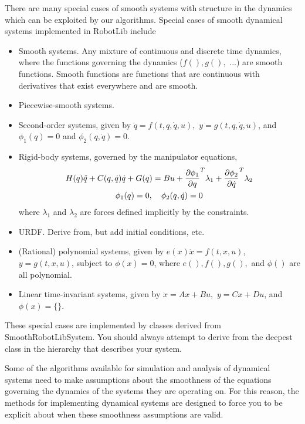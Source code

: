 There are many special cases of smooth systems with structure in the
dynamics which can be exploited by our algorithms.  Special cases of
smooth dynamical systems implemented in RobotLib include
\begin{itemize}
\item Smooth systems.  Any mixture of continuous and discrete time dynamics, where the functions governing the dynamics ($f(), g(),$ ...) are smooth functions.  Smooth functions are functions that are continuous with derivatives that exist everywhere  and are smooth\cite{wiki:Smooth_Function}.   
\item Piecewise-smooth systems. 
\item Second-order systems, given by $\ddot{q} = f(t,q,\dot{q},u),$ $y
  = g(t,q,\dot{q},u)$, and $\phi_1(q)=0$ and $\phi_2(q,\dot{q})=0$.  
\item Rigid-body systems, governed by the manipulator
  equations, \begin{gather*}H(q)\ddot{q} + C(q,\dot{q})\dot{q} + G(q) = Bu + \frac{\partial \phi_1}{\partial q}^T
  \lambda_1 + \frac{\partial \phi_2}{\partial \dot{q}}^T \lambda_2\\ \phi_1(q) = 0, \quad
  \phi_2(q,\dot{q})=0\end{gather*} where $\lambda_1$ and $\lambda_2$
are forces defined implicitly by the constraints.   
\item URDF.  Derive from, but add initial conditions, etc.
\item (Rational) polynomial systems, given by $e(x)\dot{x} =
  f(t,x,u)$, $y = g(t,x,u)$, subject to $\phi(x)=0$, where $e(), f(),
  g(),$ and $\phi()$ are all polynomial.  
\item Linear time-invariant systems, given by $\dot{x} = Ax + Bu,$
  $y=Cx + Du$, and $\phi(x)=\{\}$.  
\end{itemize}
These special cases are implemented by classes derived from SmoothRobotLibSystem.
You should always attempt to derive from the deepest class in the hierarchy that
describes your system.  


Some of the algorithms available for simulation and
analysis of dynamical systems need to make assumptions about the
smoothness of the equations governing the dynamics of the systems they
are operating on.  For this reason, the methods for implementing
dynamical systems are designed to force you to be explicit about when
these smoothness assumptions are valid.  


